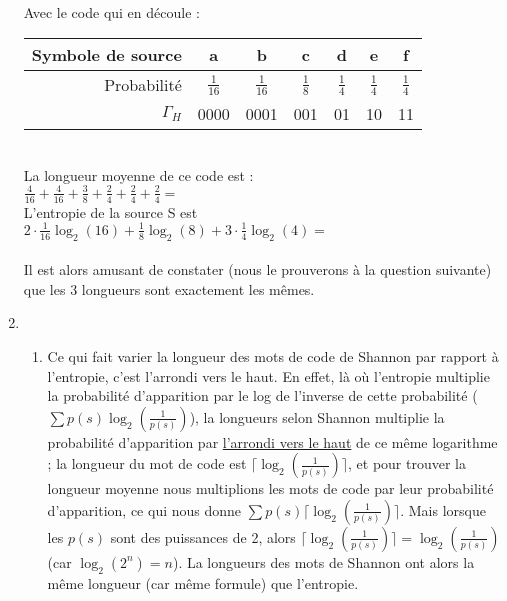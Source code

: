 \documentclass[10pt,a4paper]{article}
\begin{document}
\begin{enumerate}
\begin{center}
\\
	\end{center}
	Avec le code qui en découle : \\
	\begin{tabular}{r|c|c|c|c|c|c}
		Symbole de source & a & b & c & d & e & f\\
			\hline
		Probabilité & $\frac{1}{16}$ & $\frac{1}{16}$ & $\frac{1}{8}$ & $\frac{1}{4}$ & $\frac{1}{4}$ & $\frac{1}{4}$\\
			\hline
		$\Gamma_{H}$ & 0000 & 0001 & 001 & 01 & 10 & 11 
	\end{tabular}\\
	La longueur moyenne de ce code est :\\
	$\frac{4}{16} + \frac{4}{16} + \frac{3}{8} + \frac{2}{4}+ \frac{2}{4}+ \frac{2}{4} = $ 
	\\
	L'entropie de la source S est \\
	$2\cdot\frac{1}{16}\log_2(16) + \frac{1}{8}\log_2(8) + 3\cdot\frac{1}{4}\log_2(4) = $ \\
	\\
	Il est alors amusant de constater (nous le prouverons à la question suivante) que les 3 longueurs sont exactement les mêmes.
	\item 
		\begin{enumerate}[label=(\alph*)]
			\item Ce qui fait varier la  longueur des mots de code de Shannon par rapport à l'entropie, c'est l'arrondi vers le haut. En effet, là où l'entropie multiplie la probabilité d'apparition par le log de l'inverse de cette probabilité ($\sum p(s)\log_2(\frac{1}{p(s)})$), la longueurs selon Shannon multiplie la probabilité d'apparition par \underline{l'arrondi vers le haut} de ce même logarithme ; la longueur du mot de code est $\lceil\log_2(\frac{1}{p(s)})\rceil$, et pour trouver la longueur moyenne nous multiplions les mots de code par leur probabilité d'apparition, ce qui nous donne $\sum p(s)\lceil\log_2(\frac{1}{p(s)})\rceil$. Mais lorsque les $p(s)$ sont des puissances de 2, alors $\lceil\log_2(\frac{1}{p(s)})\rceil = \log_2(\frac{1}{p(s)})$ (car $\log_2(2^n) = n$). La longueurs des mots de Shannon ont alors la même longueur (car même formule) que l'entropie.

\end{enumerate}
\end{enumerate}
\end{document}
